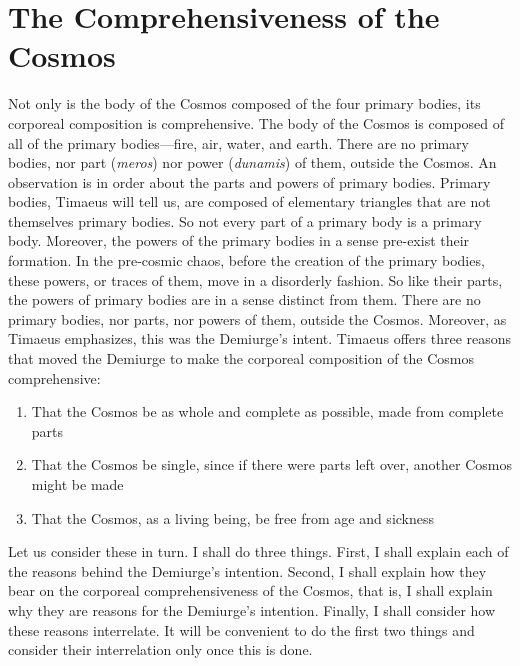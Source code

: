 
\section{The Comprehensiveness of the Cosmos} %
\label{sec:the_comprehensiveness_of_the_Cosmos}

Not only is the body of the Cosmos composed of the four primary bodies, its corporeal composition is comprehensive. The body of the Cosmos is composed of all of the primary bodies---fire, air, water, and earth. There are no primary bodies, nor part (\emph{meros}) nor power (\emph{dunamis}) of them, outside the Cosmos. An observation is in order about the parts and powers of primary bodies. Primary bodies, Timaeus will tell us, are composed of elementary triangles that are not themselves primary bodies. So not every part of a primary body is a primary body. Moreover, the powers of the primary bodies in a sense pre-exist their formation. In the pre-cosmic chaos, before the creation of the primary bodies, these powers, or traces of them, move in a disorderly fashion. So like their parts, the powers of primary bodies are in a sense distinct from them. There are no primary bodies, nor parts, nor powers of them, outside the Cosmos. Moreover, as Timaeus emphasizes, this was the Demiurge's intent. Timaeus offers three reasons that moved the Demiurge to make the corporeal composition of the Cosmos comprehensive:
\begin{enumerate}[(1)]
	\item That the Cosmos be as whole and complete as possible, made from complete parts
	\item That the Cosmos be single, since if there were parts left over, another Cosmos might be made
	\item That the Cosmos, as a living being, be free from age and sickness
\end{enumerate}
Let us consider these in turn. I shall do three things. First, I shall explain each of the reasons behind the Demiurge's intention. Second, I shall explain how they bear on the corporeal comprehensiveness of the Cosmos, that is, I shall explain why they are reasons for the Demiurge's intention. Finally, I shall consider how these reasons interrelate. It will be convenient to do the first two things and consider their interrelation only once this is done.

